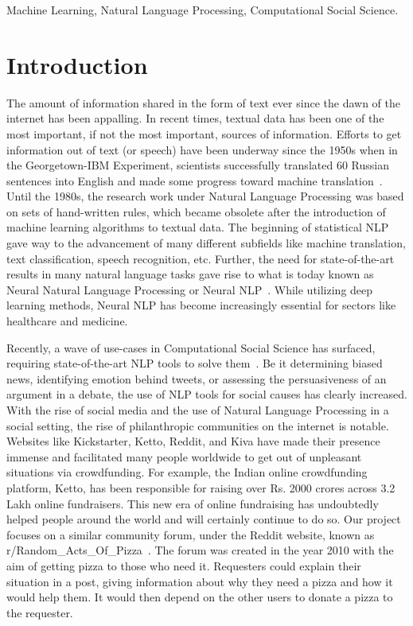 \documentclass[conference]{IEEEtran}
\begin{document}
\begin{IEEEkeywords}
Machine Learning, Natural Language Processing, Computational Social Science.
\end{IEEEkeywords}

\section{Introduction}
The amount of information shared in the form of text ever since the dawn of the internet has been appalling. In recent times, textual data has been one of the most important, if not the most important, sources of information. Efforts to get information out of text (or speech) have been underway since the 1950s when in the Georgetown-IBM Experiment, scientists successfully translated 60 Russian sentences into English and made some progress toward machine translation~\cite{gtown_exp}. Until the 1980s, the research work under Natural Language Processing was based on sets of hand-written rules, which became obsolete after the introduction of machine learning algorithms to textual data. The beginning of statistical NLP gave way to the advancement of many different subfields like machine translation, text classification, speech recognition, etc. Further, the need for state-of-the-art results in many natural language tasks gave rise to what is today known as Neural Natural Language Processing or Neural NLP~\cite{neural_nlp}. While utilizing deep learning methods, Neural NLP has become increasingly essential for sectors like healthcare and medicine.

Recently, a wave of use-cases in Computational Social Science has surfaced, requiring state-of-the-art NLP tools to solve them~\cite{compsci_nlp}. Be it determining biased news, identifying emotion behind tweets, or assessing the persuasiveness of an argument in a debate, the use of NLP tools for social causes has clearly increased. With the rise of social media and the use of Natural Language Processing in a social setting, the rise of philanthropic communities on the internet is notable. Websites like Kickstarter, Ketto, Reddit, and Kiva have made their presence immense and facilitated many people worldwide to get out of unpleasant situations via crowdfunding. For example, the Indian online crowdfunding platform, Ketto, has been responsible for raising over Rs. 2000 crores across 3.2 Lakh online fundraisers. This new era of online fundraising has undoubtedly helped people around the world and will certainly continue to do so. Our project focuses on a similar community forum, under the Reddit website, known as r/Random\_Acts\_Of\_Pizza~\cite{raop_paper}. The forum was created in the year 2010 with the aim of getting pizza to those who need it. Requesters could explain their situation in a post, giving information about why they need a pizza and how it would help them. It would then depend on the other users to donate a pizza to the requester.
\end{document}
